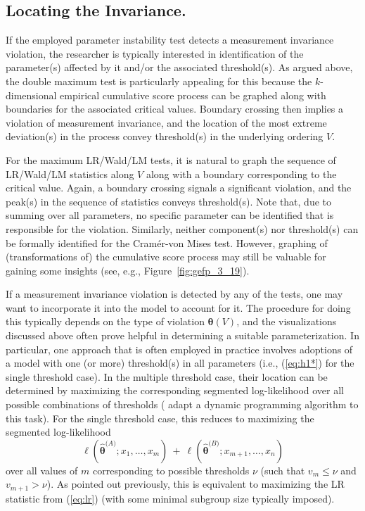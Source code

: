 \documentclass[man]{apa}
\begin{document}
\subsection{Locating the Invariance.}

If the employed parameter instability test detects a measurement invariance violation,
the researcher is typically interested in identification of the parameter(s) affected
by it and/or the associated threshold(s). As argued above, the double maximum test
is particularly appealing for this because the $k$-dimensional empirical cumulative
score process can be graphed along with boundaries for the associated critical values.
Boundary crossing then implies a violation of measurement invariance, and the location of
the most extreme deviation(s) in the process convey threshold(s) in the underlying
ordering $V$.

For the maximum LR/Wald/LM tests, it is natural to graph the sequence of LR/Wald/LM
statistics along $V$ along with a boundary corresponding to the critical value.
Again, a boundary crossing signals a significant violation, and the peak(s) in the
sequence of statistics conveys threshold(s). Note that, due to summing over all
parameters, no specific parameter can be identified that is responsible for the
violation. Similarly,  neither component(s) nor threshold(s)
can be formally identified for the Cram\'{e}r-von Mises test. However, graphing of (transformations of) the cumulative
score process may still be valuable for gaining some insights (see,
e.g., Figure~\ref{fig:gefp_3_19}).

If a measurement invariance violation is detected by any of the tests,
one may want to incorporate it into the model to account for it. The
procedure for doing this  typically depends on the type of violation ${\bm \theta}(V)$, and the visualizations
discussed above often prove helpful in determining a suitable parameterization.
In particular, one approach that is often employed in practice
involves adoptions of a model
with one (or more) threshold(s) in all parameters (i.e., (\ref{eq:h1*}) for the
single threshold case). In the multiple threshold case, their location can
be determined by maximizing the corresponding segmented log-likelihood over all
possible combinations of thresholds ( adapt a dynamic programming
algorithm to this task). For the single threshold case, this reduces to
maximizing the segmented log-likelihood
\begin{equation} \label{eq:seglik}
  \ell(\hat {\bm \theta}^{({A)}}; x_1, \dots, x_m) ~+~ \ell(\hat {\bm \theta}^{({B)}}; x_{m+1}, \dots, x_n)
\end{equation}
over all values of $m$ corresponding to possible thresholds $\nu$ (such that $v_m \le \nu$ and
$v_{m+1} > \nu$). As pointed out previously, this is equivalent to maximizing the LR statistic
from (\ref{eq:lr}) (with some minimal subgroup size typically imposed).
\end{document}
